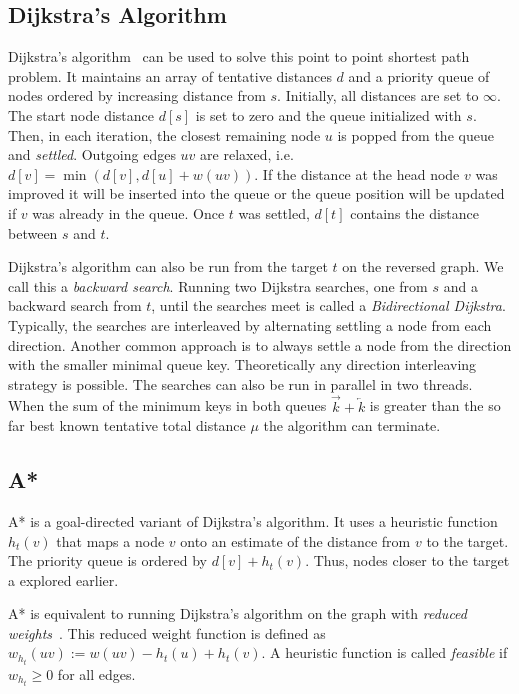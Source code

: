 \documentclass[a4paper,UKenglish,cleveref, autoref, thm-restate]{lipics-v2021}
\begin{document}
\subsection{Dijkstra's Algorithm}

Dijkstra's algorithm~\cite{d-ntpcg-59} can be used to solve this point to point shortest path problem.
It maintains an array of tentative distances $d$ and a priority queue of nodes ordered by increasing distance from $s$.
Initially, all distances are set to $\infty$.
The start node distance $d[s]$ is set to zero and the queue initialized with $s$.
Then, in each iteration, the closest remaining node $u$ is popped from the queue and \emph{settled}.
Outgoing edges $uv$ are relaxed, i.e. $d[v] = \min(d[v], d[u] + w(uv))$.
If the distance at the head node $v$ was improved it will be inserted into the queue or the queue position will be updated if $v$ was already in the queue.
Once $t$ was settled, $d[t]$ contains the distance between $s$ and $t$.

Dijkstra's algorithm can also be run from the target $t$ on the reversed graph.
We call this a \emph{backward search}.
Running two Dijkstra searches, one from $s$ and a backward search from $t$, until the searches meet is called a \emph{Bidirectional Dijkstra}.
Typically, the searches are interleaved by alternating settling a node from each direction.
Another common approach is to always settle a node from the direction with the smaller minimal queue key.
Theoretically any direction interleaving strategy is possible.
The searches can also be run in parallel in two threads.
When the sum of the minimum keys in both queues $\overrightarrow{k} + \overleftarrow{k}$ is greater than the so far best known tentative total distance $\mu$ the algorithm can terminate.

\subsection{A*}\label{sec:a_star}

A* is a goal-directed variant of Dijkstra's algorithm.
It uses a heuristic function $h_t(v)$ that maps a node $v$ onto an estimate of the distance from $v$ to the target.
The priority queue is ordered by $d[v] + h_t(v)$.
Thus, nodes closer to the target a explored earlier.

A* is equivalent to running Dijkstra's algorithm on the graph with \emph{reduced weights}~\cite{hnr-afbhd-68}.
This reduced weight function is defined as $w_{h_t}(uv) := w(uv) - h_t(u) + h_t(v)$.
A heuristic function is called \emph{feasible} if $w_{h_t} \geq 0$ for all edges.
\end{document}
